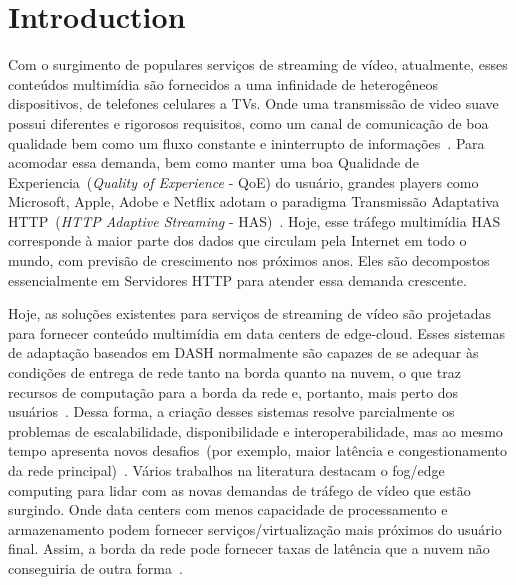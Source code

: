 \section{Introduction}
\label{sec:intro}

Com o surgimento de populares serviços de streaming de vídeo, atualmente, esses conteúdos multimídia são fornecidos a uma infinidade de heterogêneos dispositivos, de telefones celulares a TVs. Onde uma transmissão de video suave possui diferentes e rigorosos requisitos, como um canal de comunicação de boa qualidade bem como um fluxo constante e ininterrupto de informações~\cite{Immich2018WinNet}. Para acomodar essa demanda, bem como manter uma boa Qualidade de Experiencia~(\textit{Quality of Experience} - QoE) do usuário, grandes players como Microsoft, Apple, Adobe e Netflix adotam o paradigma Transmissão Adaptativa HTTP~(\textit{HTTP Adaptive Streaming} - HAS)~\cite{company:dashs}. Hoje, esse tráfego multimídia HAS corresponde à maior parte dos dados que circulam pela Internet em todo o mundo, com previsão de crescimento nos próximos anos. Eles são decompostos essencialmente em Servidores HTTP para atender essa demanda crescente.


Hoje, as soluções existentes para serviços de streaming de vídeo são projetadas para fornecer conteúdo multimídia em data centers de edge-cloud. Esses sistemas de adaptação baseados em DASH normalmente são capazes de se adequar às condições de entrega de rede tanto na borda quanto na nuvem, o que traz recursos de computação para a borda da rede e, portanto, mais perto dos usuários~\cite{sitaraman:ACD2014}. Dessa forma, a criação desses sistemas resolve parcialmente os problemas de escalabilidade, disponibilidade e interoperabilidade, mas ao mesmo tempo apresenta novos desafios~(por exemplo, maior latência e congestionamento da rede principal)~\cite{tran:wons17,ye: ITC17, taleb:JSAC18}. Vários trabalhos na literatura destacam o fog/edge computing para lidar com as novas demandas de tráfego de vídeo que estão surgindo. Onde data centers com menos capacidade de processamento e armazenamento podem fornecer serviços/virtualização mais próximos do usuário final. Assim, a borda da rede pode fornecer taxas de latência que a nuvem não conseguiria de outra forma~\cite{gamaUCC2019, rosarioSENSORS2018}.

